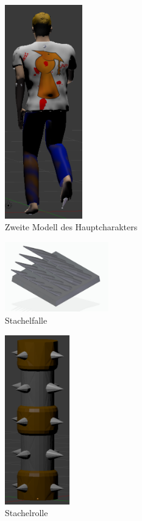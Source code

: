 \documentclass[10pt]{article}
\begin{document}
\begin{figure}[H]
	\centering
	\includegraphics[width=0.3\textwidth]{stevevonhinten}
	\caption{Zweite Modell des Hauptcharakters
		\label{fig:highpoly}}
\end{figure}

\begin{figure}[H]
	\centering
	\includegraphics[width=0.4\textwidth]{Stachelfalle}
	\caption{Stachelfalle
		\label{fig:spiketrap}}
\end{figure}

\begin{figure}[H]
	\centering
	\includegraphics[width=0.25\textwidth]{stachelrolle}
	\caption{Stachelrolle
		\label{fig:spikeroll}}
\end{figure}
\end{document}
